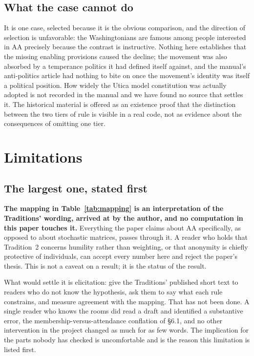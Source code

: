 \documentclass[11pt,a4paper]{article}
\begin{document}
\subsection{What the case cannot do}

It is one case, selected because it is the obvious comparison, and the direction of
selection is unfavorable: the Washingtonians are famous among people interested in
AA precisely because the contrast is instructive. Nothing here establishes that the
missing enabling provisions caused the decline; the movement was also absorbed by a
temperance politics it had defined itself against, and the manual's anti-politics
article had nothing to bite on once the movement's identity was itself a political
position. How widely the Utica model constitution was actually adopted is not
recorded in the manual and we have found no source that settles it. The historical
material is offered as an existence proof that the distinction between the two tiers
of rule is visible in a real code, not as evidence about the consequences of
omitting one tier.

\section{Limitations}

\subsection{The largest one, stated first}

\textbf{The mapping in Table~\ref{tab:mapping} is an interpretation of the
Traditions' wording, arrived at by the author, and no computation in this paper
touches it.} Everything the paper claims about AA specifically, as opposed to
about stochastic matrices, passes through it. A reader who holds that Tradition~2
concerns humility rather than weighting, or that anonymity is chiefly protective
of individuals, can accept every number here and reject the paper's thesis. This
is not a caveat on a result; it is the status of the result.

What would settle it is elicitation: give the Traditions' published short text to
readers who do not know the hypothesis, ask them to say what each rule constrains,
and measure agreement with the mapping. That has not been done. A single reader
who knows the rooms did read a draft and identified a substantive error, the
membership-versus-attendance conflation of \S6.1, and no other intervention in the
project changed as much for as few words. The implication for the parts nobody has
checked is uncomfortable and is the reason this limitation is listed first.
\end{document}
